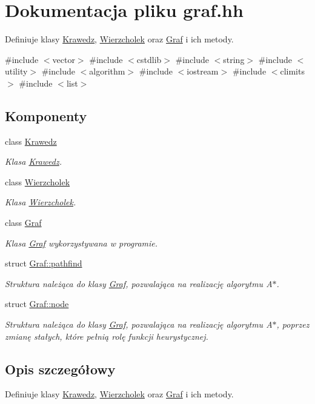 \hypertarget{graf_8hh}{\section{\-Dokumentacja pliku graf.\-hh}
\label{graf_8hh}
}


\-Definiuje klasy \hyperlink{class_krawedz}{\-Krawedz}, \hyperlink{class_wierzcholek}{\-Wierzcholek} oraz \hyperlink{class_graf}{\-Graf} i ich metody.  


{\ttfamily \#include $<$vector$>$}\*
{\ttfamily \#include $<$cstdlib$>$}\*
{\ttfamily \#include $<$string$>$}\*
{\ttfamily \#include $<$utility$>$}\*
{\ttfamily \#include $<$algorithm$>$}\*
{\ttfamily \#include $<$iostream$>$}\*
{\ttfamily \#include $<$climits$>$}\*
{\ttfamily \#include $<$list$>$}\*
\subsection*{\-Komponenty}
\begin{DoxyCompactItemize}
\item 
class \hyperlink{class_krawedz}{\-Krawedz}
\begin{DoxyCompactList}\small\item\em \-Klasa \hyperlink{class_krawedz}{\-Krawedz}. \end{DoxyCompactList}\item 
class \hyperlink{class_wierzcholek}{\-Wierzcholek}
\begin{DoxyCompactList}\small\item\em \-Klasa \hyperlink{class_wierzcholek}{\-Wierzcholek}. \end{DoxyCompactList}\item 
class \hyperlink{class_graf}{\-Graf}
\begin{DoxyCompactList}\small\item\em \-Klasa \hyperlink{class_graf}{\-Graf} wykorzystywana w programie. \end{DoxyCompactList}\item 
struct \hyperlink{struct_graf_1_1pathfind}{\-Graf\-::pathfind}
\begin{DoxyCompactList}\small\item\em \-Struktura należąca do klasy \hyperlink{class_graf}{\-Graf}, pozwalająca na realizację algorytmu \-A$\ast$. \end{DoxyCompactList}\item 
struct \hyperlink{struct_graf_1_1node}{\-Graf\-::node}
\begin{DoxyCompactList}\small\item\em \-Struktura należąca do klasy \hyperlink{class_graf}{\-Graf}, pozwalająca na realizację algorytmu \-A$\ast$, poprzez zmianę stałych, które pełnią rolę funkcji heurystycznej. \end{DoxyCompactList}\end{DoxyCompactItemize}


\subsection{\-Opis szczegółowy}
\-Definiuje klasy \hyperlink{class_krawedz}{\-Krawedz}, \hyperlink{class_wierzcholek}{\-Wierzcholek} oraz \hyperlink{class_graf}{\-Graf} i ich metody. 